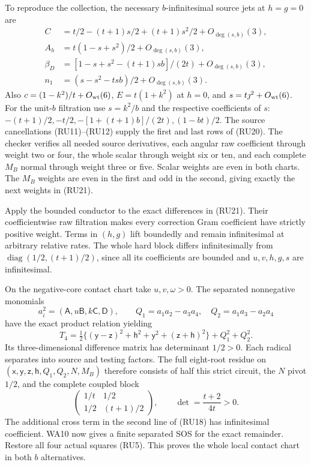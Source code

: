 To reproduce the collection, the necessary $b$-infinitesimal source
jets at $h=g=0$ are
\[
\begin{aligned}
 C&=t/2-(t+1)s/2+(t+1)s^2/2+O_{\deg(s,b)}(3),\\
 A_h&=t(1-s+s^2)/2+O_{\deg(s,b)}(3),\\
 \beta_D&=[1-s+s^2-(t+1)sb]/(2t)+O_{\deg(s,b)}(3),\\
 n_1&=(s-s^2-tsb)/2+O_{\deg(s,b)}(3).
\end{aligned}                                                     \tag{RU22}
\]
Also $c=(1-k^2)/t+O_{\rm wt}(6)$,
$E=t(1+k^2)$ at $h=0$, and
$s=t\jmath^2+O_{\rm wt}(6)$. For the unit-$b$ filtration use
$s=k^2/b$ and the respective coefficients of $s$:
$-(t+1)/2,-t/2,-[1+(t+1)b]/(2t),(1-bt)/2$.
The source cancellations (RU11)--(RU12) supply the first and last
rows of (RU20). The checker verifies all needed source derivatives,
each angular raw coefficient through weight two or four, the whole
scalar through weight six or ten, and each complete $M_B$ normal
through weight three or five. Scalar weights are even in both
charts. The $M_B$ weights are even in the first and odd in the
second, giving exactly the next weights in (RU21).

Apply the bounded conductor to the exact differences in (RU21).
Their coefficientwise raw filtration makes every correction Gram
coefficient have strictly positive weight. Terms in $(h,g)$ lift
boundedly and remain infinitesimal at arbitrary relative rates.
The whole hard block differs infinitesimally from
$\operatorname{diag}(1/2,(t+1)/2)$, since all its coefficients are
bounded and $u,v,h,g,s$ are infinitesimal.

On the negative-core contact chart take $u,v,\omega>0$. The separated
nonnegative monomials
\[
 a_i^2=(\mathsf A,u\mathsf B,k\mathsf C,\mathsf D),\qquad
 Q_1=a_1a_2-a_3a_4,\quad Q_2=a_1a_3-a_2a_4
\]
have the exact product relation yielding
\[
 T_4=\tfrac12\{(\mathsf y-\mathsf z)^2+\mathsf h^2+
                 \mathsf y^2+(\mathsf z+\mathsf h)^2\}
                  +Q_1^2+Q_2^2.                                \tag{RU23}
\]
Its three-dimensional difference matrix has determinant $1/2>0$.
Each radical separates into source and testing factors.
The full eight-root residue on
$(\mathsf x,\mathsf y,\mathsf z,\mathsf h,Q_1,Q_2,N,M_B)$
therefore consists of half this strict circuit, the $N$ pivot $1/2$,
and the complete coupled block
\[
 \begin{pmatrix}1/t&1/2\\1/2&(t+1)/2\end{pmatrix},\qquad
 \det=\frac{t+2}{4t}>0.                          \tag{RU24}
\]
The additional cross term in the second line of (RU18) has
infinitesimal coefficient. WA10 now gives a finite separated SOS
for the exact remainder. Restore all four actual squares (RU5).
This proves the whole local contact chart in both $b$ alternatives.

